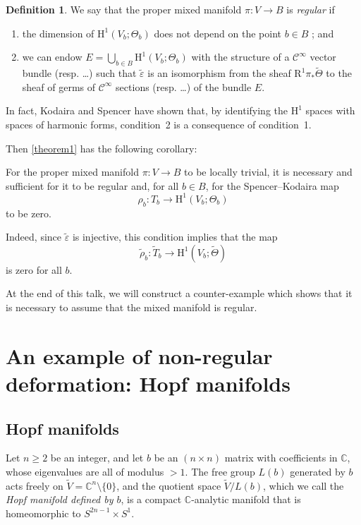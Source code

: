 \documentclass{article}
\theoremstyle{plain}
\newenvironment{proposition}[1]
    {\renewcommand\theinnercustomproposition{#1}\innercustomproposition}
    {\endinnercustomproposition}
\theoremstyle{definition}
\newtheorem*{definition*}{Definition}
\newcommand{\CC}{\mathbb{C}}
\newcommand{\HH}{\mathrm{H}}
\renewcommand{\geq}{\geqslant}
\newcommand{\oldpage}[1]{\marginpar{\footnotesize$\Big\vert$ \textit{p.~#1}}}
\begin{document}
\begin{definition*}
  We say that the proper mixed manifold $\pi\colon V\to B$ is \emph{regular} if
  \begin{enumerate}
    \item the dimension of $\HH^1(V_b;\Theta_b)$ does not depend on the point $b\in B$ ; and
    \item we can endow $E=\bigcup_{b\in B}\HH^1(V_b;\Theta_b)$ with the structure of a $\mathscr{C}^\infty$ vector bundle (resp. \ldots) such that $\widetilde{\varepsilon}$ is an isomorphism from the sheaf $\mathrm{R}^1\pi_*\widetilde{\Theta}$ to the sheaf of germs of $\mathscr{C}^\infty$ sections (resp. \ldots) of the bundle $E$.
  \end{enumerate}
\end{definition*}

In fact, Kodaira and Spencer have shown \cite{2} that, by identifying the $\HH^1$ spaces with spaces of harmonic forms, condition~2 is a consequence of condition~1.

Then \cref{theorem1} has the following corollary:

\begin{proposition}{1}
\label{proposition1}
  For the proper mixed manifold $\pi\colon V\to B$ to be locally trivial, it is necessary and sufficient for it to be regular and, for all $b\in B$, for the Spencer--Kodaira map
  \[
    \rho_b\colon T_b \to \HH^1(V_b;\Theta_b)
  \]
  to be zero.
\end{proposition}

Indeed, since $\widetilde{\varepsilon}$ is injective, this condition implies that the map
\oldpage{3-04}
\[
  \widetilde{\rho}_b\colon \widetilde{T}_b \to \HH^1(V_b;\widetilde{\Theta})
\]
is zero for all $b$.

At the end of this talk, we will construct a counter-example which shows that it is necessary to assume that the mixed manifold is regular.


\section{An example of non-regular deformation: Hopf manifolds}
\label{III}

\subsection{Hopf manifolds}
\label{III.1}

Let $n\geq2$ be an integer, and let $b$ be an $(n\times n)$ matrix with coefficients in $\CC$, whose eigenvalues are all of modulus $>1$.
The free group $L(b)$ generated by $b$ acts freely on $\widetilde{V}=\CC^n\setminus\{0\}$, and the quotient space $\widetilde{V}/L(b)$, which we call the \emph{Hopf manifold defined by $b$}, is a compact $\CC$-analytic manifold that is homeomorphic to $S^{2n-1}\times S^1$.
\end{document}
